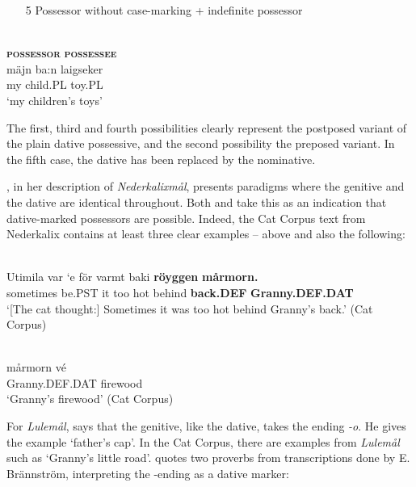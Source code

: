 \begin{enumerate}
\item[5] Possessor without case-marking + indefinite possessor
\end{enumerate}


\ea\label{}
\\
\glll \textbf{\textsc{possessor}} \textbf{\textsc{possessee}}\\
mäjn  ba:n  laigseker\\
my  child.PL  toy.PL\\
\glt ‘my children’s toys’
\z

The first, third and fourth possibilities clearly represent the postposed variant of the plain dative possessive, and the second possibility the preposed variant. In the fifth case, the dative has been replaced by the nominative.  

\citet{Rutberg1924}, in her description of \textit{Nederkalixmål}, presents paradigms where the genitive and the dative are identical throughout. Both \citet[161]{Källskog1992} and \citet[42]{Delsing2003a} take this as an indication that dative-marked possessors are possible. Indeed, the Cat Corpus text from Nederkalix contains at least three clear examples –  above and also the following:

\renewcommand{\eachwordone}{\itshape}


\ea\label{}
\\
\gll Utimila  var  ‘e  för  varmt  baki  \textbf{röyggen} \textbf{mårmorn.}\\
sometimes  be.PST  it  too  hot  behind  \textbf{back.DEF} \textbf{Granny.DEF.DAT}\\
\glt ‘[The cat thought:] Sometimes it was too hot behind Granny’s back.’ (Cat Corpus)
\z

\ea\label{}
\\
\gll mårmorn  vé\\
Granny.DEF.DAT  firewood\\
\glt ‘Granny’s firewood’  (Cat Corpus)
\z

For \textit{Lulemål}, \citet{Nordström1925} says that the genitive, like the dative, takes the ending\textit{ {}-o}. He gives the example  ‘father’s cap’. In the Cat Corpus, there are examples from \textit{Lulemål} such as  ‘Granny’s little road’.  \citet[163]{Källskog1992} quotes two proverbs from transcriptions done by E. Brännström, interpreting the -ending as a dative marker: 

